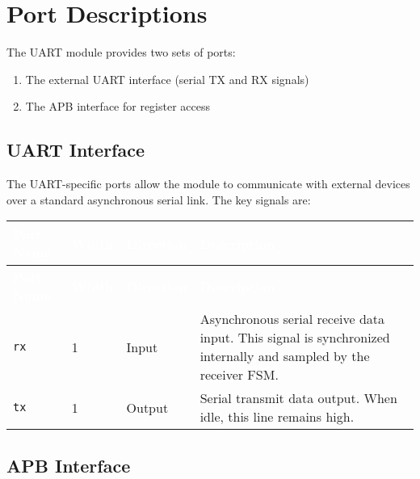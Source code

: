 \section{Port Descriptions}

The UART module provides two sets of ports:
\begin{enumerate}
  \item The external UART interface (serial TX and RX signals)
  \item The APB interface for register access
\end{enumerate}

\subsection{UART Interface}

The UART-specific ports allow the module to communicate with external devices over a standard asynchronous serial link. The key signals are:

\renewcommand*{\arraystretch}{1.3}
\begingroup
\small
{}
\begin{longtable}[H]{
  | p{}
  | p{}
  | p{}
  | p{} |
}
\hline
\rowcolor{gray}
\textcolor{white}{\textbf{Port Name}} &
\textcolor{white}{\textbf{Width}} &
\textcolor{white}{\textbf{Direction}} &
\textcolor{white}{\textbf{Description}} \\ \hline
\endfirsthead

\hline
\rowcolor{gray}
\textcolor{white}{\textbf{Port Name}} &
\textcolor{white}{\textbf{Width}} &
\textcolor{white}{\textbf{Direction}} &
\textcolor{white}{\textbf{Description}} \\ \hline
\endhead

\hline
\endfoot

\texttt{rx} &
1 &
Input &
Asynchronous serial receive data input. This signal is synchronized internally and sampled by the receiver FSM. \\ \hline

\texttt{tx} &
1 &
Output &
Serial transmit data output. When idle, this line remains high. \\ \hline
\end{longtable}
\label{table:uart_ports}
\endgroup

\subsection{APB Interface}


